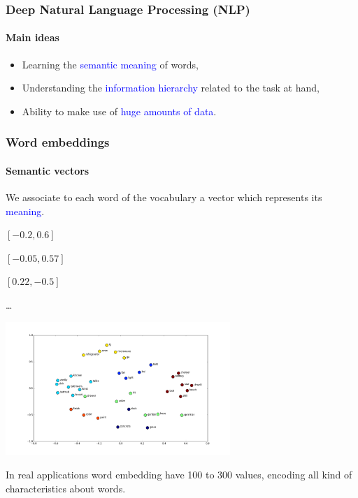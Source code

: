 \documentclass[9pt]{beamer}
\begin{document}
\begin{frame}
  \frametitle{Deep Natural Language Processing (NLP)}

  \framesubtitle{Main ideas}

  \begin{itemize}
    \item Learning the \textcolor{blue}{semantic meaning} of words,
      \pause
      \bigskip
    \item Understanding the \textcolor{blue}{information hierarchy} related to
      the task at hand,
      \bigskip
      \pause
    \item Ability to make use of \textcolor{blue}{huge amounts of data}.
  \end{itemize}
\end{frame}

\begin{frame}
  \frametitle{Word embeddings}

  \framesubtitle{Semantic vectors}

  We associate to each word of the vocabulary a vector which
  represents its \textcolor{blue}{meaning}.

  \begin{center}
    \begin{description}
      \item[Oven] $[-0.2, 0.6]$
      \item[Microwave] $[-0.05, 0.57]$
      \item[Garden] $[0.22, -0.5]$
      \item \dots
    \end{description}
  \end{center}

  \vspace{-.9cm}

  \begin{center}
    \includegraphics[width = 8.5cm]{images/word_embeddings_5.png}
  \end{center}

  \vspace{-0.5cm}

  In real applications word embedding have 100 to 300 values,
  encoding all kind of characteristics about words.
\end{frame}
\end{document}
